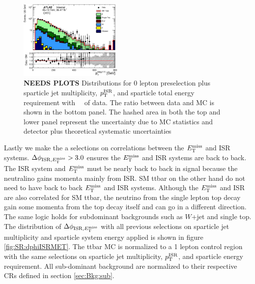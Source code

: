 \begin{figure}[htbp]
\begin{center}
    \includegraphics[width=0.45\textwidth]{figures/ttbar/postfit/CA_pTbV1_CRTopC_log}
  \end{center}
  \caption{{\bf NEEDS PLOTS} Distributions for 0 lepton preselection plus sparticle jet multiplicity, $p_{\mathrm{T}}^{\mathrm{ISR}}$, and sparticle total energy requirement with \intlumi\ \ifb\ of data. The ratio between data and MC is shown in the bottom panel. The hashed area in both the top and lower panel represent the uncertainty due to MC statistics and detector plus theoretical systematic uncertainties}
  \label{fig:SR:sparticleEnergy}
\end{figure}

\indent Lastly we make the a selections on correlations between the $E_{\mathrm{T}}^{\mathrm{miss}}$ and ISR systems.  $\Delta\phi_{\mathrm{ISR},E_{\mathrm{T}}^{\mathrm{miss}}} > 3.0$ ensures the $E_{\mathrm{T}}^{\mathrm{miss}}$ and ISR systems are back to back.  The ISR system and $E_{\mathrm{T}}^{\mathrm{miss}}$ must be nearly back to back in signal because the neutralino gains momenta mainly from ISR.  SM ttbar on the other hand do not need to have back to back $E_{\mathrm{T}}^{\mathrm{miss}}$ and ISR systems.  Although the $E_{\mathrm{T}}^{\mathrm{miss}}$ and ISR are also correlated for SM ttbar, the neutrino from the single lepton top decay gain some momenta from the top decay itself and can go in a different direction. The same logic holds for subdominant backgrounds such as $W$+jet and single top. \\

\indent The distribution of $\Delta\phi_{\mathrm{ISR},E_{\mathrm{T}}^{\mathrm{miss}}}$ with all previous selections on sparticle jet multiplicity and sparticle system energy applied is shown in figure \ref{fig:SR:dphiISRMET}.   The ttbar MC is normalized to a 1 lepton control region with the same selections on sparticle jet multiplicity, $p_{\mathrm{T}}^{\mathrm{ISR}}$, and sparticle energy requirement.  All sub-dominant background are normalized to their respective CRs defined in section \ref{sec:Bkg:sub}. \\

